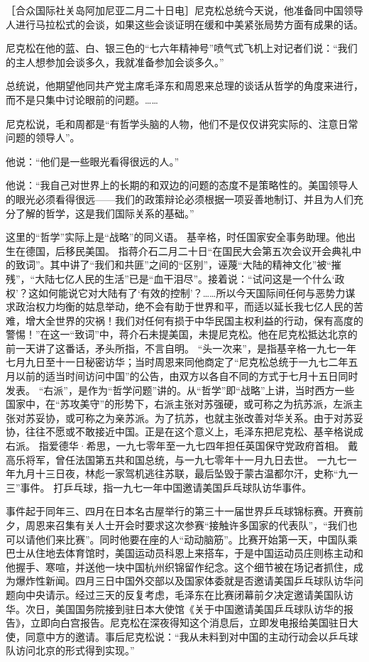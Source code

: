 \begin{maonote}
［合众国际社关岛阿加尼亚二月二十日电］尼克松总统今天说，他准备同中国领导人进行马拉松式的会谈，如果这些会谈证明在缓和中美紧张局势方面有成果的话。

尼克松在他的蓝、白、银三色的“七六年精神号”喷气式飞机上对记者们说：“我们的主人想参加会谈多久，我就准备参加会谈多久。”

总统说，他期望他同共产党主席毛泽东和周恩来总理的谈话从哲学的角度来进行，而不是只集中讨论眼前的问题。……

尼克松说，毛和周都是“有哲学头脑的人物，他们不是仅仅讲究实际的、注意日常问题的领导人”。

他说：“他们是一些眼光看得很远的人。”

他说：“我自己对世界上的长期的和双边的问题的态度不是策略性的。美国领导人的眼光必须看得很远——我们的政策辩论必须根据一项妥善地制订、并且为人们充分了解的哲学，这是我们国际关系的基础。”

这里的“哲学”实际上是“战略”的同义语。
基辛格，时任国家安全事务助理。他出生在德国，后移民美国。
指蒋介石二月二十日“在国民大会第五次会议开会典礼中的致词”。其中讲了“我们和共匪”之间的“区别”，诬蔑“大陆的精神文化”被“摧残”，“大陆七亿人民的生活”已是“血干泪尽”。接着说：“试问这是一个什么‘政权’？这如何能说它对大陆有了‘有效的控制’？……所以今天国际间任何与恶势力谋求政治权力均衡的姑息举动，绝不会有助于世界和平，而适以延长我七亿人民的苦难，增大全世界的灾祸！我们对任何有损于中华民国主权利益的行动，保有高度的警惕！”在这一“致词”中，蒋介石未提美国，未提尼克松。他在尼克松抵达北京的前一天讲了这番话，矛头所指，不言自明。
“头一次来”，是指基辛格一九七一年七月九日至十一日秘密访华；当时周恩来同他商定了“尼克松总统于一九七二年五月以前的适当时间访问中国”的公告，由双方以各自不同的方式于七月十五日同时发表。
“右派”，是作为“哲学问题”讲的。从“哲学”即“战略”上讲，当时西方一些国家中，在“苏攻美守”的形势下，右派主张对苏强硬，或可称之为抗苏派，左派主张对苏妥协，或可称之为亲苏派。为了抗苏，也就主张改善对华关系。由于对苏妥协，往往不愿或不敢接近中国。正是在这个意义上，毛泽东把尼克松、基辛格说成右派。
指爱德华·希思，一九七零年至一九七四年担任英国保守党政府首相。
戴高乐将军，曾任法国第五共和国总统，与一九七零年十一月九日去世。
一九七一年九月十三日夜，林彪一家驾机逃往苏联，最后坠毁于蒙古温都尔汗，史称“九一三”事件。
打乒乓球，指一九七一年中国邀请美国乒乓球队访华事件。

事件起于同年三、四月在日本名古屋举行的第三十一届世界乒乓球锦标赛。开赛前夕，周恩来召集有关人士开会时要求这次参赛“接触许多国家的代表队”，“我们也可以请他们来比赛”。同时他要在座的人“动动脑筋”。比赛开始第一天，中国队乘巴士从住地去体育馆时，美国运动员科恩上来搭车，于是中国运动员庄则栋主动和他握手、寒喧，并送他一块中国杭州织锦留作纪念。这个细节被在场记者抓住，成为爆炸性新闻。四月三日中国外交部以及国家体委就是否邀请美国乒乓球队访华问题向中央请示。经过三天的反复考虑，毛泽东在比赛闭幕前夕决定邀请美国队访华。次日，美国国务院接到驻日本大使馆《关于中国邀请美国乒乓球队访华的报告》，立即向白宫报告。尼克松在深夜得知这个消息后，立即发电报给美国驻日大使，同意中方的邀请。事后尼克松说：“我从未料到对中国的主动行动会以乒乓球队访问北京的形式得到实现。”


\end{maonote}
